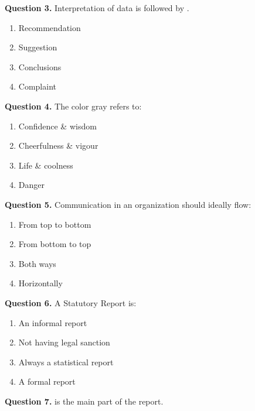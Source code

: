 \documentclass[11pt,a4paper]{article}
\begin{document}
\medskip


\noindent   \textbf{Question 3.} Interpretation of data is followed by \underline{\hspace{2cm}}.

\begin{enumerate}[label=(\alph*),itemsep=2pt]
  \item Recommendation
  \item Suggestion
  \item Conclusions
  \item Complaint
\end{enumerate}

\medskip


\noindent   \textbf{Question 4.} The color gray refers to:

\begin{enumerate}[label=(\alph*),itemsep=2pt]
  \item Confidence \& wisdom
  \item Cheerfulness \& vigour
  \item Life \& coolness
  \item Danger
\end{enumerate}

\medskip


\noindent   \textbf{Question 5.} Communication in an organization should ideally flow:

\begin{enumerate}[label=(\alph*),itemsep=2pt]
  \item From top to bottom
  \item From bottom to top
  \item Both ways
  \item Horizontally
\end{enumerate}

\medskip


\noindent   \textbf{Question 6.} A Statutory Report is:

\begin{enumerate}[label=(\alph*),itemsep=2pt]
  \item An informal report
  \item Not having legal sanction
  \item Always a statistical report
  \item A formal report
\end{enumerate}

\medskip


\noindent   \textbf{Question 7.} \underline{\hspace{2cm}} is the main part of the report.
\end{document}
